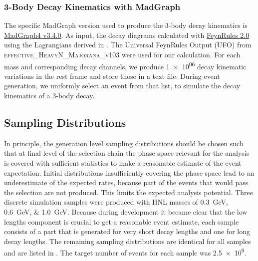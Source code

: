 \subsubsection{3-Body Decay Kinematics with MadGraph} 

The specific MadGraph version used to produce the 3-body decay kinematics is \href{https://launchpad.net/mg5amcnlo/3.0/3.3.x}{MadGraph4 v3.4.0}. As input, the decay diagrams calculated with \href{http://feynrules.irmp.ucl.ac.be/#FeynRules2.0}{FeynRules 2.0} using the Lagrangians derived in . The Universal FeynRules Output (UFO) from \textsc{effective\_HeavyN\_Majorana\_v103} were used for our calculation. For each mass and corresponding decay channels, we produce \SI{1e06}{} decay kinematic variations in the rest frame and store those in a text file. During event generation, we uniformly select an event from that list, to simulate the decay kinematics of a 3-body decay.


\subsection{Sampling Distributions}

In principle, the generation level sampling distributions should be chosen such that at final level of the selection chain the phase space relevant for the analysis is covered with sufficient statistics to make a reasonable estimate of the event expectation. Initial distributions insufficiently covering the phase space lead to an underestimate of the expected rates, because part of the events that would pass the selection are not produced. This limits the expected analysis potential.
Three discrete simulation samples were produced with HNL masses of \SIlist{0.3;0.6;1.0}{\GeV}. Because during development it became clear that the low lengths component is crucial to get a reasonable event estimate, each sample consists of a part that is generated for very short decay lengths and one for long decay lengths. The remaining sampling distributions are identical for all samples and are listed in . The target number of events for each sample was \SI{2.5e9}{}.

